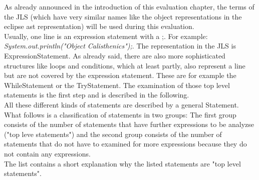 As already announced in the introduction of this evaluation chapter, the terms of the \acf{JLS} (which have very similar names like the object representations in the eclipse ast representation) will be used during this evaluation. 
\\

Usually, one line is an expression statement with a ;. For example: \textit{System.out.println("Object Calisthenics");}. The representation in the \acf{JLS} is ExpressionStatement. As already said, there are also more sophisticated structures like loops and conditions, which at least partly, also represent a line but are not covered by the expression statement. These are for example the WhileStatement or the TryStatement. The examination of those top level statements is the first step and is described in the following.
\\

All these different kinds of statements are described by a general Statement. What follows is a classification of statements in two groups: The first group consists of the number of statements that have further expressions to be analyzse ("top leve statements") and the second group consists of the number of statements that do not have to examined for more expressions because they do not contain any expressions. 
\\

The list contains a short explanation why the listed statements are "top level statements".
\\

